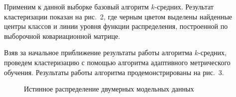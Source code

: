 \documentclass[12pt,twoside]{article}
\begin{document}
Применим к данной выборке базовый алгоритм $k$-средних.
Результат кластеризации показан на рис.~2, где черным цветом выделены найденные центры классов и линии уровня функции распределения, построенной по выборочной ковариационной матрице.

Взяв за начальное приближение результаты работы алгоритма $k$-средних,
проведем клас\-те\-ри\-за\-цию с помощью алгоритма адаптивного метрического обучения.
Результаты работы алгоритма продемонстрированы на рис.~$3$.
\begin{figure}[h]
    \caption{Истинное распределение двумерных модельных данных}
\end{figure}
\end{document}
